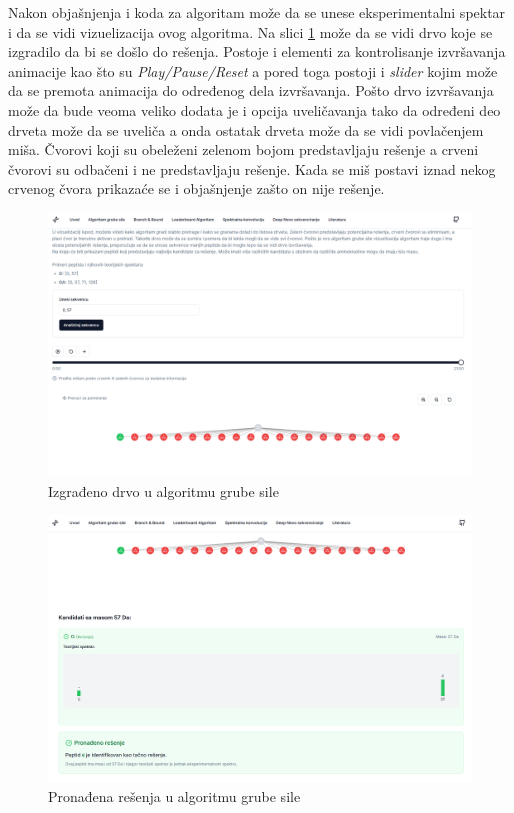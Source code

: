 \documentclass[12pt,oneside]{memoir}
\begin{document}
Nakon objašnjenja i koda za algoritam može da se unese eksperimentalni spektar i da se vidi vizuelizacija ovog algoritma. Na slici \ref{fig:brute_force_2} može da se vidi drvo koje se izgradilo da bi se došlo do rešenja. Postoje i elementi za kontrolisanje izvršavanja animacije kao što su \emph{Play/Pause/Reset} a pored toga postoji i \emph{slider} kojim može da se premota animacija do određenog dela izvršavanja. Pošto drvo izvršavanja može da bude veoma veliko dodata je i opcija uveličavanja tako da određeni deo drveta može da se uveliča a onda ostatak drveta može da se vidi povlačenjem miša. Čvorovi koji su obeleženi zelenom bojom predstavljaju rešenje a crveni čvorovi su odbačeni i ne predstavljaju rešenje. Kada se miš postavi iznad nekog crvenog čvora prikazaće se i objašnjenje zašto on nije rešenje.
\begin{figure}[H]
\centering
\includegraphics[width=1\textwidth]{images/brute_force_2.png}
\caption{Izgrađeno drvo u algoritmu grube sile}
\label{fig:brute_force_2}
\end{figure}

\begin{figure}[H]
\centering
\includegraphics[width=1\textwidth]{images/brute_force_3.png}
\caption{Pronađena rešenja u algoritmu grube sile}
\label{fig:brute_force_3}
\end{figure}
\end{document}

